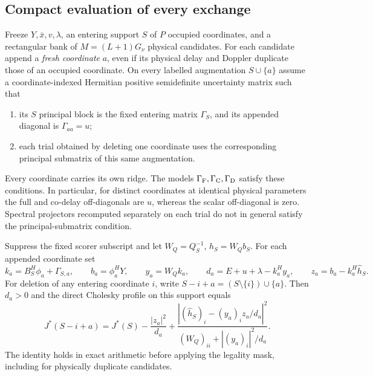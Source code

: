 \subsection{Compact evaluation of every exchange}

\begin{afdmprop}
\label{prop:af-exchange}
Freeze $Y,\bar x,v,\lambda$, an entering support $S$ of $P$ occupied
coordinates, and a rectangular bank of $M=(L+1)G_\nu$ physical
candidates. For each candidate append a \emph{fresh coordinate} $a$,
even if its physical delay and Doppler duplicate those of an occupied
coordinate. On every labelled augmentation $S\cup\{a\}$ assume a
coordinate-indexed Hermitian positive semidefinite uncertainty matrix
such that
\begin{enumerate}
\item its $S$ principal block is the fixed entering matrix $\Gamma_S$,
and its appended diagonal is $\Gamma_{aa}=u$;
\item each trial obtained by deleting one coordinate uses the
corresponding principal submatrix of this same augmentation.
\end{enumerate}
Every coordinate carries its own ridge. The models
$\Gamma_{\rm F},\Gamma_{\rm C},\Gamma_{\rm D}$ satisfy these
conditions. In particular, for distinct coordinates at identical
physical parameters the full and co-delay off-diagonals are $u$,
whereas the scalar off-diagonal is zero. Spectral projectors
recomputed separately on each trial do not in general satisfy the
principal-submatrix condition.

Suppress the fixed scorer subscript and let
$W_Q=Q_S^{-1}$, $\hat h_S=W_Qb_S$. For each appended coordinate set
\[
 k_a=B_S^H\phi_a+\Gamma_{S,a},\qquad
 b_a=\phi_a^HY,\qquad
 y_a=W_Qk_a,\qquad
 d_a=E+u+\lambda-k_a^Hy_a,\qquad
 z_a=b_a-k_a^H\hat h_S .
\]
For deletion of any entering coordinate $i$, write
$S-i+a=(S\setminus\{i\})\cup\{a\}$. Then $d_a>0$ and the direct
Cholesky profile on this support equals
\begin{equation}
 J^*(S-i+a)=J^*(S)-\frac{|z_a|^2}{d_a}
 +\frac{|(\hat h_S)_i-(y_a)_i z_a/d_a|^2}
        {(W_Q)_{ii}+|(y_a)_i|^2/d_a}.                     \label{eq:af-exchange}
\end{equation}
The identity holds in exact arithmetic before applying the legality
mask, including for physically duplicate candidates.
\end{afdmprop}

